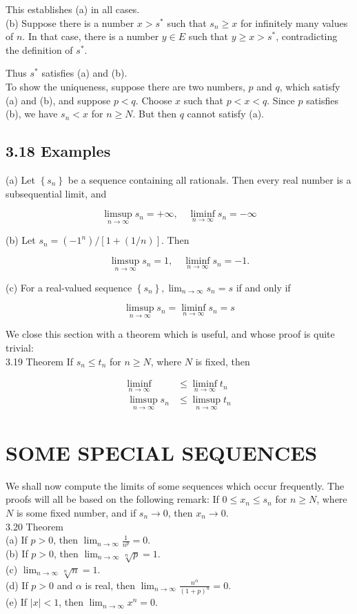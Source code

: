 \documentclass[10pt]{article}
\begin{document}
This establishes (a) in all cases.\\
(b) Suppose there is a number $x>s^{*}$ such that $s_{n} \geq x$ for infinitely many values of $n$. In that case, there is a number $y \in E$ such that $y \geq x>s^{*}$, contradicting the definition of $s^{*}$.

Thus $s^{*}$ satisfies (a) and (b).\\
To show the uniqueness, suppose there are two numbers, $p$ and $q$, which satisfy (a) and (b), and suppose $p<q$. Choose $x$ such that $p<x<q$. Since $p$ satisfies (b), we have $s_{n}<x$ for $n \geq N$. But then $q$ cannot satisfy (a).

\subsection*{3.18 Examples}
(a) Let $\left\{s_{n}\right\}$ be a sequence containing all rationals. Then every real number is a subsequential limit, and

$$
\limsup _{n \rightarrow \infty} s_{n}=+\infty, \quad \liminf _{n \rightarrow \infty} s_{n}=-\infty
$$

(b) Let $s_{n}=\left(-1^{n}\right) /[1+(1 / n)]$. Then

$$
\limsup _{n \rightarrow \infty} s_{n}=1, \quad \liminf _{n \rightarrow \infty} s_{n}=-1 .
$$

(c) For a real-valued sequence $\left\{s_{n}\right\}, \lim _{n \rightarrow \infty} s_{n}=s$ if and only if

$$
\limsup _{n \rightarrow \infty} s_{n}=\liminf _{n \rightarrow \infty} s_{n}=s
$$

We close this section with a theorem which is useful, and whose proof is quite trivial:\\
3.19 Theorem If $s_{n} \leq t_{n}$ for $n \geq N$, where $N$ is fixed, then

$$
\begin{aligned}
\liminf _{n \rightarrow \infty} & \leq \liminf _{n \rightarrow \infty} t_{n} \\
\limsup _{n \rightarrow \infty} s_{n} & \leq \limsup _{n \rightarrow \infty} t_{n}
\end{aligned}
$$

\section*{SOME SPECIAL SEQUENCES}
We shall now compute the limits of some sequences which occur frequently. The proofs will all be based on the following remark: If $0 \leq x_{n} \leq s_{n}$ for $n \geq N$, where $N$ is some fixed number, and if $s_{n} \rightarrow 0$, then $x_{n} \rightarrow 0$.\\
3.20 Theorem\\
(a) If $p>0$, then $\lim _{n \rightarrow \infty} \frac{1}{n^{p}}=0$.\\
(b) If $p>0$, then $\lim _{n \rightarrow \infty} \sqrt[n]{p}=1$.\\
(c) $\lim _{n \rightarrow \infty} \sqrt[n]{n}=1$.\\
(d) If $p>0$ and $\alpha$ is real, then $\lim _{n \rightarrow \infty} \frac{n^{\alpha}}{(1+p)^{n}}=0$.\\
(e) If $|x|<1$, then $\lim _{n \rightarrow \infty} x^{n}=0$.
\end{document}
